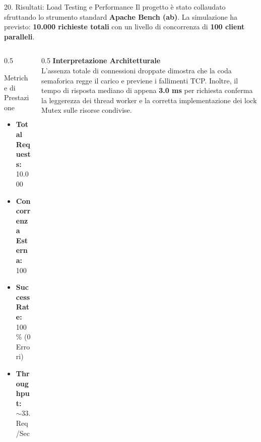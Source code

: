\documentclass[aspectratio=169, 10pt]{beamer}
\begin{document}
\begin{frame}{20. Risultati: Load Testing e Performance}
    Il progetto è stato collaudato sfruttando lo strumento standard \textbf{Apache Bench (ab)}.
    La simulazione ha previsto: \textbf{10.000 richieste totali} con un livello di concorrenza di \textbf{100 client paralleli}.
    
    \vspace{0.3cm}
    
    \begin{columns}
        \begin{column}{0.5\textwidth}
            \begin{block}{Metriche di Prestazione}
                \begin{itemize}
                    \item \textbf{Total Requests:} 10.000
                    \item \textbf{Concorrenza Esterna:} 100
                    \item \textbf{Success Rate:} 100\% (0 Errori)
                    \item \textbf{Throughput:} $\sim 33.229$ Req/Sec
                \end{itemize}
            \end{block}
        \end{column}
        \begin{column}{0.5\textwidth}
            \textbf{Interpretazione Architetturale} \\
            L'assenza totale di connessioni droppate dimostra che la coda semaforica regge il carico e previene i fallimenti TCP. 
            Inoltre, il tempo di risposta mediano di appena \textbf{3.0 ms} per richiesta conferma la leggerezza dei thread worker e la corretta implementazione dei lock Mutex sulle risorse condivise.
        \end{column}
    \end{columns}
\end{frame}
\end{document}
